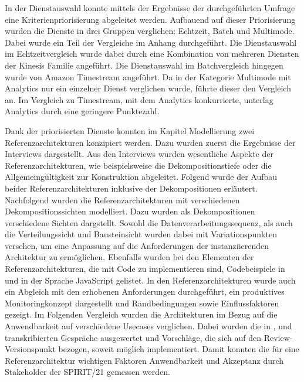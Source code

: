 In der Dienstauswahl konnte mittels der Ergebnisse der durchgeführten Umfrage eine Kriterienpriorisierung abgeleitet werden. 
Aufbauend auf dieser Priorisierung wurden die Dienste in drei Gruppen verglichen: Echtzeit, Batch und Multimode. Dabei wurde ein Teil der Vergleiche im Anhang durchgeführt.
Die Dienstauswahl im Echtzeitvergleich wurde dabei durch eine Kombination von mehreren Diensten der Kinesis Familie angeführt.
Die Dienstauswahl im Batchvergleich hingegen wurde von Amazon Timestream angeführt. 
Da in der Kategorie Multimode mit \AWSIOT{} Analytics nur ein einzelner Dienst verglichen wurde, führte dieser den Vergleich an.
Im Vergleich zu Timestream, mit dem \AWSIOT{} Analytics konkurrierte, unterlag \AWSIOT{} Analytics durch eine geringere Punktezahl.

Dank der priorisierten Dienste konnten im Kapitel Modellierung zwei Referenzarchitekturen konzipiert werden.
Dazu wurden zuerst die Ergebnisse der Interviews dargestellt.
Aus den Interviews wurden wesentliche Aspekte der Referenzarchitekturen, wie beispielsweise die Dekompositionstiefe oder die Allgemeingültigkeit zur Konstruktion abgeleitet. 
Folgend wurde der Aufbau beider Referenzarchitekturen inklusive der Dekompositionen erläutert.
Nachfolgend wurden die Referenzarchitekturen mit verschiedenen Dekompositionssichten modelliert. Dazu wurden als Dekompositionen verschiedene Sichten dargstellt. Sowohl die Datenverarbeitungssequenz, als auch die Verteilungssicht und Bausteinsicht wurden dabei mit Variationspunkten versehen, um eine Anpassung auf die Anforderungen der instanziierenden Architektur zu ermöglichen. Ebenfalls wurden bei den Elementen der Referenzarchitekturen, die mit Code zu implementieren sind, Codebeispiele in  und  in der Sprache JavaScript gelistet. In den Referenzarchitekturen wurde auch ein Abgleich mit den erhobenen Anforderungen durchgeführt, ein produktives Monitoringkonzept dargestellt und Randbedingungen sowie Einflussfaktoren gezeigt.
Im Folgenden Vergleich wurden die Architekturen im Bezug auf die Anwendbarkeit auf verschiedene Usecases verglichen. Dabei wurden die in ,  und  transkribierten Gespräche ausgewertet und Vorschläge, die sich auf den Review-Versionspunkt bezogen, soweit möglich implementiert. Damit konnten die für eine Referenzarchitektur wichtigen Faktoren Anwendbarkeit und Akzeptanz durch Stakeholder der SPIRIT/21 gemessen werden.


